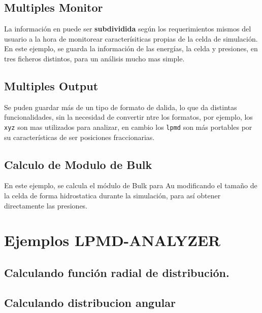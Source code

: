 \subsection{Multiples Monitor}

La informaci\'on en \lpmd puede ser \textbf{subdividida} seg\'un los requerimientos mismos del usuario a la hora de monitorear caracter\'isiticas propias de la celda de simulaci\'on. En este ejemplo, se guarda la informaci\'on de las energ\'ias, la celda y presiones, en tres ficheros distintos, para un an\'alisis mucho mas simple.


\subsection{Multiples Output}

Se puden guardar m\'as de un tipo de formato de dalida, lo que da distintas funcionalidades, sin la necesidad de convertir ntre los formatos, por ejemplo, los \verb|xyz| son mas utilizados para analizar, en cambio los \verb|lpmd| son m\'as portables por su caracter\'isticas de ser posiciones fraccionarias.


\subsection{Calculo de Modulo de Bulk}

En este ejemplo, se calcula el m\'odulo de Bulk para Au modificando el tama\~no de la celda de forma hidrostatica durante la simulaci\'on, para as\'i obtener directamente las presiones.

\section{Ejemplos LPMD-ANALYZER}

\subsection{Calculando funci\'on radial de distribuci\'on.}

\subsection{Calculando distribucion angular}


